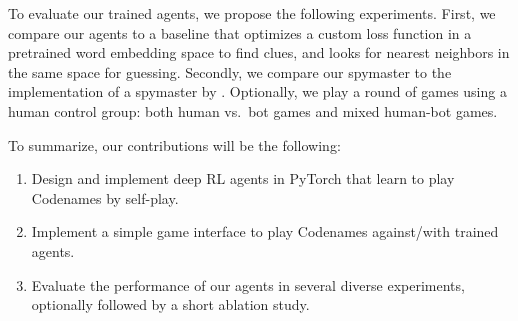 \documentclass{article}
\begin{document}
To evaluate our trained agents, we propose the following experiments. First, we compare our agents to a baseline that optimizes a custom loss function in a pretrained word embedding space to find clues, and looks for nearest neighbors in the same space for guessing. Secondly, we compare our spymaster to the implementation of a spymaster by \cite{codenamesai}. Optionally, we play a round of games using a human control group: both human vs.~bot games and mixed human-bot games.

To summarize, our contributions will be the following:
\begin{enumerate}
    \item Design and implement deep RL agents in PyTorch that learn to play Codenames by self-play.
    \item Implement a simple game interface to play Codenames against/with trained agents.
    \item Evaluate the performance of our agents in several diverse experiments, optionally followed by a short ablation study.
\end{enumerate}




\end{document}

